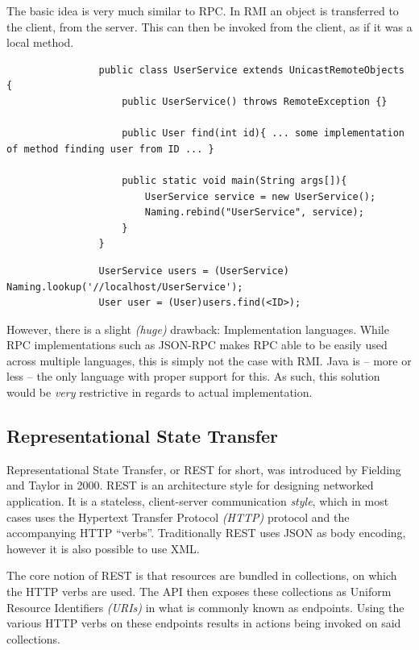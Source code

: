 			The basic idea is very much similar to RPC. In RMI an object is transferred to the client, from the server. This can then be invoked from the client, as if it was a local method. 

			\begin{lstlisting}
				public class UserService extends UnicastRemoteObjects {
					public UserService() throws RemoteException {}

					public User find(int id){ ... some implementation of method finding user from ID ... }

					public static void main(String args[]){
						UserService service = new UserService();
						Naming.rebind("UserService", service);
					}
				}
			\end{lstlisting}

			\begin{lstlisting}
				UserService users = (UserService) Naming.lookup('//localhost/UserService');
				User user = (User)users.find(<ID>);
			\end{lstlisting}


			However, there is a slight \emph{(huge)} drawback: Implementation languages. While RPC implementations such as JSON-RPC makes RPC able to be easily used across multiple languages, this is simply not the case with RMI. Java is -- more or less -- the only language with proper support for this. As such, this solution would be \emph{very} restrictive in regards to actual implementation.


		\subsection{Representational State Transfer}
			Representational State Transfer, or REST for short, was introduced by Fielding and Taylor \cite{Fielding:2000:PDM:337180.337228} in 2000. REST is an architecture style for designing networked application. It is a stateless, client-server communication \emph{style}, which in most cases uses the Hypertext Transfer Protocol \emph{(HTTP)} protocol and the accompanying HTTP ``verbs''. Traditionally REST uses JSON as body encoding, however it is also possible to use XML.

			The core notion of REST is that resources are bundled in collections, on which the HTTP verbs are used. The API then exposes these collections as Uniform Resource Identifiers \emph{(URIs)} in what is commonly known as endpoints. Using the various HTTP verbs on these endpoints results in actions being invoked on said collections.

